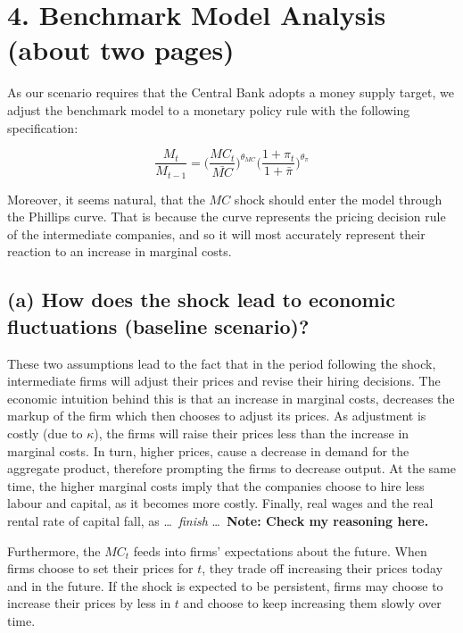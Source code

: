 \documentclass[12pt]{article}
\begin{document}
\section*{4. Benchmark Model Analysis (about two pages)}

As our scenario requires that the Central Bank adopts a money supply target, we adjust the benchmark model to a monetary policy rule with the following specification: 

\begin{equation}
    \frac{M_t}{M_{t-1}} = \Big(\frac{MC_{t}}{\bar{MC}}\Big)^{\theta_{MC}} \Big(\frac{1+\pi_{t}}{1+ \bar \pi}\Big)^{\theta_{\pi}}
\end{equation}

Moreover, it seems natural, that the $MC$ shock should enter the model through the Phillips curve. That is because the curve represents the pricing decision rule of the intermediate companies, and so it will most accurately represent their reaction to an increase in marginal costs.

\subsection*{(a) How does the shock lead to economic fluctuations (baseline scenario)?}

These two assumptions lead to the fact that in the period following the shock, intermediate firms will adjust their prices and revise their hiring decisions. The economic intuition behind this is that an increase in marginal costs, decreases the markup of the firm which then chooses to adjust its prices. As adjustment is costly (due to $\kappa$), the firms will raise their prices less than the increase in marginal costs. In turn, higher prices, cause a decrease in demand for the aggregate product, therefore prompting the firms to decrease output. At the same time, the higher marginal costs imply that the companies choose to hire less labour and capital, as it becomes more costly. Finally, real wages and the real rental rate of capital fall, as \dots\ \textit{finish} \dots\ \textbf{Note: Check my reasoning here.}

Furthermore, the $MC_t$ feeds into firms' expectations about the future. When firms choose to set their prices for $t$, they trade off increasing their prices today and in the future. If the shock is expected to be persistent, firms may choose to increase their prices by less in $t$ and choose to keep increasing them slowly over time. 
\end{document}
